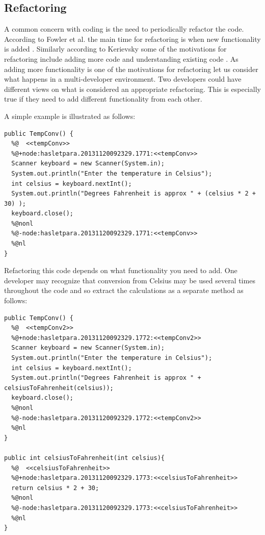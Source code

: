 \documentclass[12pt]{CRPITStyle}
\renewcommand{\cite}{\citep}
\begin{document}
\subsection{Refactoring}
A common concern with coding is the need to periodically refactor the code. According to Fowler et al. the main time for refactoring is when new functionality is added \cite{Fowler1999}. Similarly according to Kerievsky some of the motivations for refactoring include adding more code and understanding existing code \cite{Kerievsky2004}. As adding more functionality is one of the motivations for refactoring let us consider what happens in a multi-developer environment. Two developers could have different views on what is considered an appropriate refactoring. This is especially true if they need to add different functionality from each other. 

A simple example is illustrated as follows:
\begin{verbatim}
public TempConv() {
  %@  <<tempConv>>
  %@+node:hasletpara.20131120092329.1771:<<tempConv>>
  Scanner keyboard = new Scanner(System.in);
  System.out.println("Enter the temperature in Celsius");
  int celsius = keyboard.nextInt();
  System.out.println("Degrees Fahrenheit is approx " + (celsius * 2 + 30) );
  keyboard.close();
  %@nonl
  %@-node:hasletpara.20131120092329.1771:<<tempConv>>
  %@nl
}
\end{verbatim}

Refactoring this code depends on what functionality you need to add. One developer may recognize that conversion from Celsius may be used several times throughout the code and so extract the calculations as a separate method as follows:

\begin{verbatim}
public TempConv() {
  %@  <<tempConv2>>
  %@+node:hasletpara.20131120092329.1772:<<tempConv2>>
  Scanner keyboard = new Scanner(System.in);
  System.out.println("Enter the temperature in Celsius");
  int celsius = keyboard.nextInt();
  System.out.println("Degrees Fahrenheit is approx " + celsiusToFahrenheit(celsius));
  keyboard.close();
  %@nonl
  %@-node:hasletpara.20131120092329.1772:<<tempConv2>>
  %@nl
}

public int celsiusToFahrenheit(int celsius){
  %@  <<celsiusToFahrenheit>>
  %@+node:hasletpara.20131120092329.1773:<<celsiusToFahrenheit>>
  return celsius * 2 + 30;
  %@nonl
  %@-node:hasletpara.20131120092329.1773:<<celsiusToFahrenheit>>
  %@nl
}
\end{verbatim}
\end{document}
